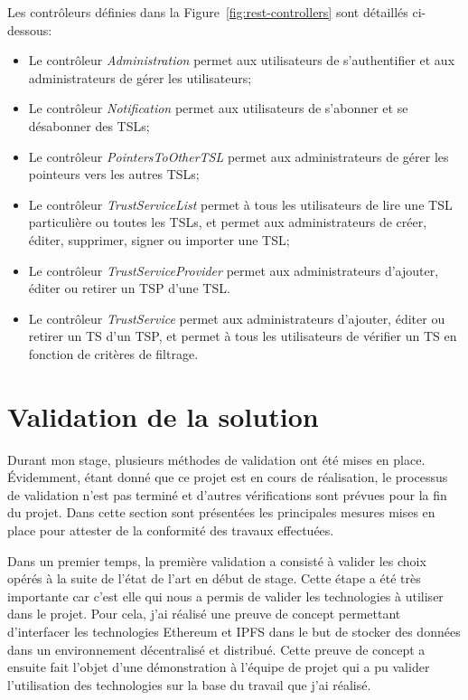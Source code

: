 \documentclass{tnreport}
\begin{document}
Les contrôleurs définies dans la Figure~\ref{fig:rest-controllers} sont détaillés ci-dessous:
\begin{itemize}
	\item Le contrôleur \textit{Administration} permet aux utilisateurs de s'authentifier et aux administrateurs de gérer les utilisateurs;
	\item Le contrôleur \textit{Notification} permet aux utilisateurs de s'abonner et se désabonner des TSLs;
	\item Le contrôleur \textit{PointersToOtherTSL} permet aux administrateurs de gérer les pointeurs vers les autres TSLs;
	\item Le contrôleur \textit{TrustServiceList} permet à tous les utilisateurs de lire une TSL particulière ou toutes les TSLs, et permet aux administrateurs de créer, éditer, supprimer, signer ou importer une TSL;
	\item Le contrôleur \textit{TrustServiceProvider} permet aux administrateurs d'ajouter, éditer ou retirer un TSP d'une TSL.
	\item Le contrôleur \textit{TrustService} permet aux administrateurs d'ajouter, éditer ou retirer un TS d'un TSP, et permet à tous les utilisateurs de vérifier un TS en fonction de critères de filtrage.
\end{itemize}

\section{Validation de la solution}

Durant mon stage, plusieurs méthodes de validation ont été mises en place. Évidemment, étant
donné que ce projet est en cours de réalisation, le processus de validation n'est pas terminé et d'autres vérifications sont prévues pour la fin du projet. Dans cette section sont présentées les principales mesures mises en place pour attester de la conformité des travaux effectuées.

Dans un premier temps, la première validation a consisté à valider les choix opérés à la suite de l'état de l'art en début de stage. Cette étape a été très importante car c'est elle qui nous a permis de valider les technologies à utiliser dans le projet. Pour cela, j'ai réalisé une preuve de concept permettant d'interfacer les technologies Ethereum et IPFS dans le but de stocker des données dans un environnement décentralisé et distribué. Cette preuve de concept a ensuite fait l'objet d'une démonstration à l'équipe de projet qui a pu valider l'utilisation des technologies sur la base du travail que j'ai réalisé.
\end{document}
